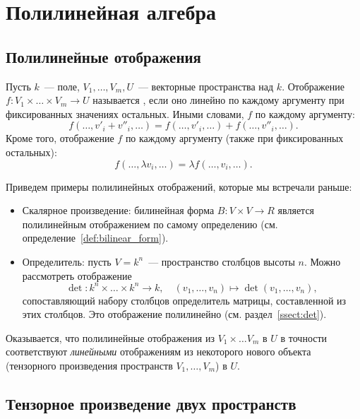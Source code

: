 \section{Полилинейная алгебра}

\subsection{Полилинейные отображения}


Пусть $k$~--- поле, $V_1, \dots, V_m, U$~--- векторные пространства
над $k$. Отображение
$f\colon V_1\times\dots\times V_m\to U$ называется
, если оно линейно
по каждому аргументу при фиксированных значениях остальных. Иными
словами, $f$  по каждому
аргументу:
$$
f(\dots,v'_i+v''_i,\dots) =
f(\dots,v'_i,\dots) + f(\dots,v''_i,\dots).
$$
Кроме того, отображение $f$
 по каждому
аргументу (также при фиксированных остальных):
$$
f(\dots,\lambda v_i,\dots) = \lambda f(\dots,v_i,\dots).
$$

Приведем примеры полилинейных отображений, которые мы
встречали раньше:
\begin{itemize}
\item Скалярное произведение: билинейная форма
  $B\colon V\times V\to R$ является полилинейным отображением по самому
  определению (см. определение~\ref{def:bilinear_form}).
\item Определитель: пусть $V = k^n$~--- пространство столбцов высоты
  $n$. Можно рассмотреть отображение
  $$
  \det\colon k^n\times\dots\times k^n\to k,\quad
  (v_1,\dots,v_n)\mapsto\det(v_1,\dots,v_n),
  $$
  сопоставляющий набору столбцов определитель матрицы, составленной из
  этих столбцов. Это отображение полилинейно
  (см. раздел~\ref{ssect:det}).
\end{itemize}

Оказывается, что полилинейные отображения из $V_1\times\dots V_m$ в
$U$ в точности соответствуют {\em линейными} отображениям из
некоторого нового объекта (тензорного произведения пространств
$V_1,\dots,V_m$) в $U$.

\subsection{Тензорное произведение двух пространств}


